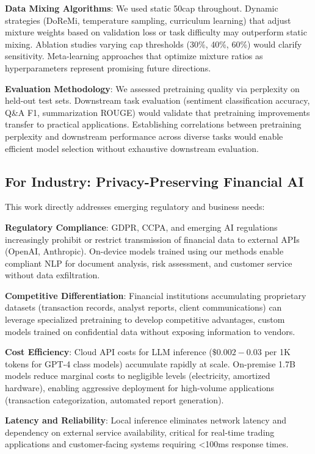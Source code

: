 \textbf{Data Mixing Algorithms}: We used static 50cap throughout. Dynamic strategies (DoReMi, temperature sampling, curriculum learning) that adjust mixture weights based on validation loss or task difficulty may outperform static mixing. Ablation studies varying cap thresholds (30\%, 40\%, 60\%) would clarify sensitivity. Meta-learning approaches that optimize mixture ratios as hyperparameters represent promising future directions.

\textbf{Evaluation Methodology}: We assessed pretraining quality via perplexity on held-out test sets. Downstream task evaluation (sentiment classification accuracy, Q\&A F1, summarization ROUGE) would validate that pretraining improvements transfer to practical applications. Establishing correlations between pretraining perplexity and downstream performance across diverse tasks would enable efficient model selection without exhaustive downstream evaluation.

\subsection{For Industry: Privacy-Preserving Financial AI}

This work directly addresses emerging regulatory and business needs:

\textbf{Regulatory Compliance}: GDPR, CCPA, and emerging AI regulations increasingly prohibit or restrict transmission of financial data to external APIs (OpenAI, Anthropic). On-device models trained using our methods enable compliant NLP for document analysis, risk assessment, and customer service without data exfiltration.

\textbf{Competitive Differentiation}: Financial institutions accumulating proprietary datasets (transaction records, analyst reports, client communications) can leverage specialized pretraining to develop competitive advantages, custom models trained on confidential data without exposing information to vendors.

\textbf{Cost Efficiency}: Cloud API costs for LLM inference ($\$0.002-0.03$ per 1K tokens for GPT-4 class models) accumulate rapidly at scale. On-premise 1.7B models reduce marginal costs to negligible levels (electricity, amortized hardware), enabling aggressive deployment for high-volume applications (transaction categorization, automated report generation).

\textbf{Latency and Reliability}: Local inference eliminates network latency and dependency on external service availability, critical for real-time trading applications and customer-facing systems requiring <100ms response times.

